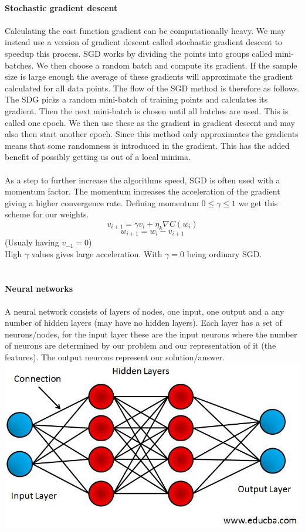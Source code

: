 \documentclass[12pt, letterpaper, twoside]{article}
\begin{document}
\newpage
\ \\
\textbf{Stochastic gradient descent}\\
\ \\
Calculating the cost function gradient can be computationally heavy. We may instead use a version of gradient descent called stochastic gradient descent to speedup this process. SGD works by dividing the points into groups called mini-batches. We then choose a random batch and compute its gradient. If the sample size is large enough the average of these gradients will approximate the gradient calculated for all data points. The flow of the SGD method is therefore as follows. The SDG picks a random mini-batch of training points and calculates its gradient. Then the next mini-batch is chosen until all batches are used. This is called one epoch. We then use these as the gradient in gradient descent and may also then start another epoch. Since this method only approximates the gradients means that some randomness is introduced in the gradient. This has the added benefit of possibly getting us out of a local minima.\\
\ \\
As a step to further increase the algorithms speed, SGD is often used with a momentum factor. The momentum increases the acceleration of the gradient giving a higher convergence rate. Defining momentum $0 \leq \gamma \leq 1$ we get this scheme for our weights.
$$
v_{i+1} = \gamma v_i + \eta_k \nabla C(w_i)
$$
$$
w_{i+1} = w_i - v_{i+1}
$$
(Usualy having $v_{-1} = 0$)\\
High $\gamma$ values gives large acceleration. With $\gamma = 0$ being ordinary SGD.\\
\ \\
\ \\
\textbf{Neural networks}\\
\ \\
A neural network consists of layers of nodes, one input, one output and a any number of hidden layers (may have no hidden layers).
Each layer has a set of neurons/nodes, for the input layer these are the input neurons where the number of neurons are determined by our problem and our representation of it (the features). The output neurons represent our solution/answer.\\
\includegraphics[scale=0.5]{"NN"}\\
\end{document}
